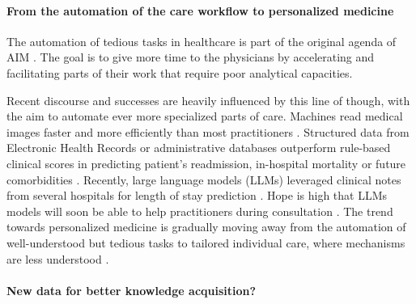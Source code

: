 \documentclass[french,12pt,twoside,a4paper]{book}
\begin{document}

\paragraph{From the automation of the care workflow to personalized medicine}

The automation of tedious tasks in healthcare is part of the original agenda of
AIM \citep{schwartz1987artificial}. The goal is to give more time to the
physicians by accelerating and facilitating parts of their work that require
poor analytical capacities.

Recent discourse and successes are heavily influenced by this line of though,
with the aim to automate ever more specialized parts of care. Machines read
medical images faster and more efficiently than most practitioners
\citep{zhou2021review}. Structured data from Electronic Health Records
\citep{rajkomar2018scalable} or administrative databases
\citep{beaulieu2021machine} outperform rule-based clinical scores in predicting
patient's readmission, in-hospital mortality or future comorbidities
\citep{li2020behrt}. Recently, large language models (LLMs) leveraged clinical
notes from several hospitals for length of stay prediction
\citep{jiang2023health}. Hope is high that LLMs models will soon be able to help
practitioners during consultation \citep{lee2023benefits}. The trend towards
personalized medicine is gradually moving away from the automation of
well-understood but tedious tasks to tailored individual care, where mechanisms are less
understood \citep{schork2015personalized, topol2019high}.

\paragraph{New data for better knowledge acquisition?}
\end{document}
